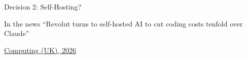 \documentclass[aspectratio=169]{beamer}
\begin{document}
\begin{frame}[shrink=0]{Decision 2: Self-Hosting?}
  \null\vfill
  \begin{block}{In the news}
    \centering\LARGE ``Revolut turns to self-hosted AI to cut coding costs tenfold over Claude''\par
  \end{block}
  \bigskip
  {\centering\small\href{https://www.computing.co.uk/news/2026/ai/revolut-turns-to-self-hosted-ai-to-cut-coding-costs-tenfold-over-claude}{Computing (UK), 2026}\par}
  \vfill
\end{frame}
\end{document}
